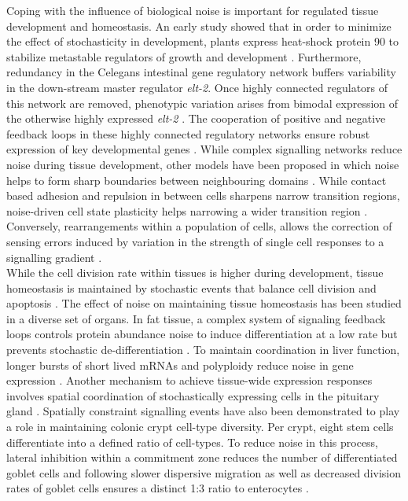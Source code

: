 Coping with the influence of biological noise is important for regulated tissue development and homeostasis. An early study showed that in order to minimize the effect of stochasticity in development, plants express heat-shock protein 90 to stabilize metastable regulators of growth and development \citep{Queitsch2002}. Furthermore, redundancy in the \Gls{Celegans} intestinal gene regulatory network buffers variability in the down-stream master regulator \textit{elt-2}. Once highly connected regulators of this network are removed, phenotypic variation arises from bimodal expression of the otherwise highly expressed \textit{elt-2} \citep{Raj2010}. The cooperation of positive and negative feedback loops in these highly connected regulatory networks ensure robust expression of key developmental genes \citep{Ji2013}. While complex signalling networks reduce noise during tissue development, other models have been proposed in which noise helps to form sharp boundaries between neighbouring domains \citep{Zhang2012}. While contact based adhesion and repulsion in between cells sharpens narrow transition regions, noise-driven cell state plasticity helps narrowing a wider transition region \citep{Wang2017}. Conversely, rearrangements within a population of cells, allows the correction of sensing errors induced by variation in the strength of single cell responses to a signalling gradient \citep{Camley2017}.\\

While the cell division rate within tissues is higher during development, tissue homeostasis is maintained by stochastic events that balance cell division and apoptosis \citep{Ranft2010}. The effect of noise on maintaining tissue homeostasis has been studied in a diverse set of organs. In fat tissue, a complex system of signaling feedback loops controls protein abundance noise to induce differentiation at a low rate but prevents stochastic de-differentiation \citep{Ahrends2014}. To maintain coordination in liver function, longer bursts of short lived mRNAs and polyploidy reduce noise in gene expression \citep{BaharHalpern2015}. Another mechanism to achieve tissue-wide expression responses involves spatial coordination of stochastically expressing cells in the pituitary gland \citep{Featherstone2016}. Spatially constraint signalling events have also been demonstrated to play a role in maintaining colonic crypt cell-type diversity. Per crypt, eight stem cells differentiate into a defined ratio of cell-types. To reduce noise in this process, lateral inhibition within a commitment zone reduces the number of differentiated goblet cells and following slower dispersive migration as well as decreased division rates of goblet cells ensures a distinct 1:3 ratio to enterocytes \citep{Toth2017}.

